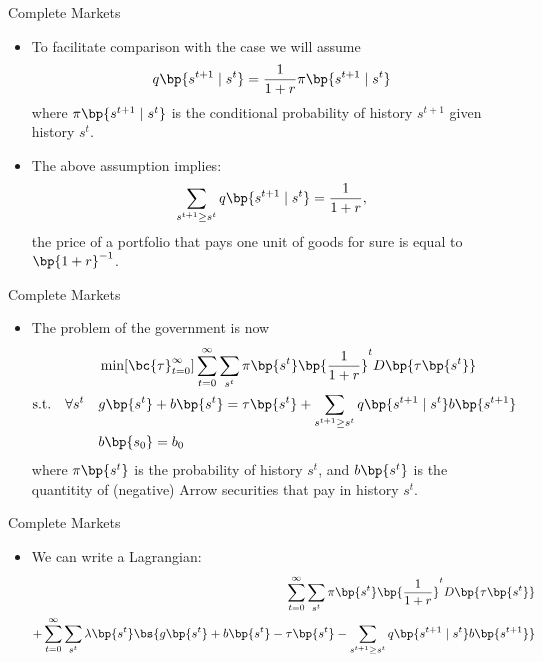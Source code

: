 \documentclass[11pt,xcolor={dvipsnames},hyperref={pdftex,pdfpagemode=UseNone,hidelinks,pdfdisplaydoctitle=true},usepdftitle=false]{beamer}
\begin{document}
        \begin{frame}{Complete Markets}
            \begin{itemize}
            \item To facilitate comparison with the  case we will assume 
            \begin{align*}
                q\bp{s^{t+1}\mid s^t} = \frac{1}{1+r} \pi\bp{s^{t+1}\mid s^t} 
            \end{align*}
            where $\pi\bp{s^{t+1}\mid s^t}$ is the conditional probability of history $s^{t+1}$ given history $s^t$.
            \item The above assumption implies: 
            \begin{align*}
                \sum_{s^{t+1} \geq  s^t} q\bp{s^{t+1}\mid s^t} = \frac{1}{1+r},
            \end{align*}
            the price of a portfolio that pays one unit of goods for sure is equal to $\bp{1+r}^{-1}$.
            \end{itemize}
            \end{frame}

        \begin{frame}{Complete Markets}
            \begin{itemize}
            \item The problem of the government is now 
            \begin{align*}  
            &\min[\bc{\tau}_{t=0}^\infty] \sum_{t=0}^\infty \sum_{s^t} \pi \bp{s^t} \bp{\frac{1}{1+r}}^t D\bp{\tau \bp{s^t}}\\
            \text{s.t.} \quad \forall s^t \quad & g\bp{s^t} + b \bp{s^{t}}=\tau\bp{s^t} + \sum_{s^{t+1} \geq  s^t} q\bp{s^{t+1}\mid s^t} b \bp{s^{t+1}}  \\
            & b \bp{s_0}  = b_0 
            \end{align*}
            where $\pi\bp{s^t}$ is the probability of history $s^t$, and $b\bp{s^t}$ is the quantitity of (negative) Arrow securities that pay in history $s^t$.
              \end{itemize}
            \end{frame}


        \begin{frame}{Complete Markets}
            \begin{itemize}
            \item We can write a Lagrangian:
            \begin{align*}  
            \sum_{t=0}^\infty \sum_{s^t} \pi \bp{s^t} \bp{\frac{1}{1+r}}^t D\bp{\tau \bp{s^t}}\\
            + \sum_{t=0}^\infty \sum_{s^t} \lambda \bp{s^t}\bs{g\bp{s^t} + b \bp{s^{t}}-\tau\bp{s^t} - \sum_{s^{t+1} \geq  s^t} q\bp{s^{t+1}\mid s^t} b \bp{s^{t+1} } }
            \end{align*}
            \end{itemize}
            \end{frame}
\end{document}
